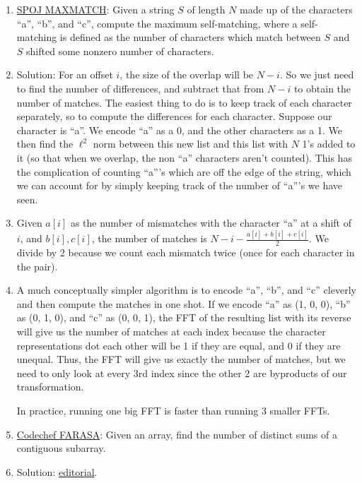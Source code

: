 \documentclass[11pt,handout]{beamer}             %
\begin{document}
\begin{frame}
\begin{enumerate}
  \item \href{https://www.spoj.com/problems/MAXMATCH/}{SPOJ MAXMATCH}:
    Given a string \( S \) of length \( N \) made up of the characters
    \enquote{a}, \enquote{b}, and \enquote{c}, compute the maximum
    self-matching, where a self-matching is defined as the number of characters
    which match between \( S \) and \( S \) shifted some
    nonzero number of characters.
   \addtocounter{enumi}{-1}
 \item Solution: For an offset \( i \), the size of the overlap
    will be \( N - i \). So we just need to find the number of differences,
    and subtract that from \( N - i \) to obtain the number of matches.
    The easiest thing to do is to keep track of each character separately,
    so to compute the differences for each character.
    Suppose our character is \enquote{a}. We encode \enquote{a} as a 0,
    and the other characters as a 1. We then find the \( \ell^2 \) norm between 
    this new list and this list with \( N \) 1's added to it
    (so that when we overlap, the non \enquote{a} characters aren't counted).
    This has the complication of counting \enquote{a}'s which are off the edge
    of the string, which we can account for by simply keeping track of the 
    number of \enquote{a}'s we have seen.
    \addtocounter{enumi}{-1}
  \item Given \( a[i] \) as the number of mismatches with the character \enquote{a}
    at a shift of \( i \), and \( b[i], c[i] \), the number of matches is 
    \( N - i - \frac{a[i] + b[i] + c[i]}{2} \). We divide by 2 because we
    count each mismatch twice (once for each character in the pair).
    \addtocounter{enumi}{-1}
  \item A much conceptually simpler algorithm is to encode \enquote{a}, \enquote{b},
    and \enquote{c} cleverly and then compute the matches in one shot. 
    If we encode \enquote{a} as (1, 0, 0), \enquote{b} as (0, 1, 0), and
    \enquote{c} as (0, 0, 1), the FFT of the resulting list with its reverse
    will give us the number of matches at each index because the character
    representations dot each other will be 1 if they are equal, and 0 
    if they are unequal. Thus, the FFT will give us exactly the number of
    matches, but we need to only look at every 3rd index since the other 2
    are byproducts of our transformation.

    In practice, running one big FFT is faster than running 3 smaller FFTs.

  \item \href{https://www.codechef.com/problems/FARASA}{Codechef FARASA}:
    Given an array, find the number of distinct sums of a contiguous subarray.
    \addtocounter{enumi}{-1}
  \item Solution: \href{https://discuss.codechef.com/t/farasa-editorial/2688}
    {editorial}.


\end{enumerate}
\end{frame}
\end{document}
